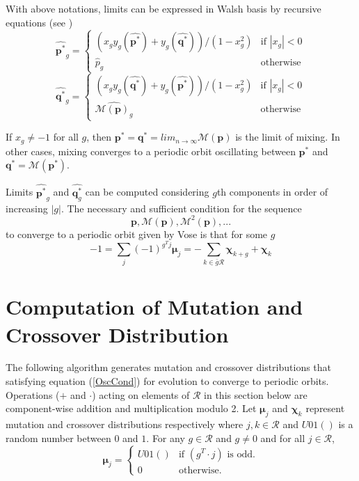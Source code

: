 With above notations, limits can be expressed in Walsh basis by recursive equations (see \cite{Vose1999})
\begin{equation}
\label{lt1}
\widehat{{\bm p}^{\ast}}_g  = \begin{cases}
    (x_g y_g(\widehat{{\bm p}^{\ast}}) + y_g(\widehat{{\bm q}^{\ast}}))/(1-x_g^2)  & \text{if $|x_g| < 0$}\\
    \widehat{p}_g  & \text{otherwise}
  \end{cases}
\end{equation}
\begin{equation}
\label{lt2}
\widehat{{\bm q}^{\ast}}_g  = \begin{cases}
    (x_g y_g(\widehat{{\bm q}^{\ast}}) + y_g(\widehat{{\bm p}^{\ast}}))/(1-x_g^2)  & \text{if $|x_g| < 0$}\\
    \widehat{\mathcal{M}({\bm p})_g}  & \text{otherwise}
  \end{cases}
\end{equation}

If $x_g \neq -1$ for all $g$, then ${\bm p}^\ast = {\bm q}^\ast = lim_{n \rightarrow \infty} \mathcal{M}({\bm p})$ is the limit of mixing. In other cases, 
mixing converges to a periodic orbit oscillating between ${\bm p}^\ast$ and ${\bm q}^\ast = \mathcal{M}({\bm p}^\ast)$.

Limits $\widehat{{\bm p}^{\ast}}_g$ and $\widehat{{\bm q}^{\ast}_g}$ can be computed considering $g$th components in order of increasing $|g|$.
The necessary and sufficient condition for the sequence
\[
\bm{p}, \mathcal{M}({\bm p}), \mathcal{M}^2({\bm p}),...
\]
to converge to a periodic orbit given by Vose is that for some $g$
\begin{equation}
\label{OscCond}
-1 = \sum \limits_{j} (-1)^{g^T j} \bm{\mu}_j = - \sum \limits_{k \in \bar{g}\mathcal{R}} \bm{\chi}_{k+g} + \bm{\chi}_k
\end{equation}
 
\section{Computation of Mutation and Crossover Distribution}
The following algorithm generates mutation and crossover distributions that satisfying equation (\ref{OscCond}) 
for evolution to converge to periodic orbits. Operations ($+$ and $\cdot$) acting on elements of $\mathcal{R}$ 
in this section below are component-wise addition and multiplication modulo 2. 
Let $\bm{\mu}_j$ and $\bm{\chi}_k$ represent mutation and crossover distributions respectively where $j,k \in \mathcal{R}$ 
and $U01()$ is a random number between $0$ and $1$. For any $g \in \mathcal{R}$ and $g \neq 0$ and for all $j \in \mathcal{R}$,
\[
\bm{\mu}_j = \begin{cases}
    U01() & \text{if $(g^T\cdot j)$ is odd}.\\
    0 & \text{otherwise}.
  \end{cases}
\]

